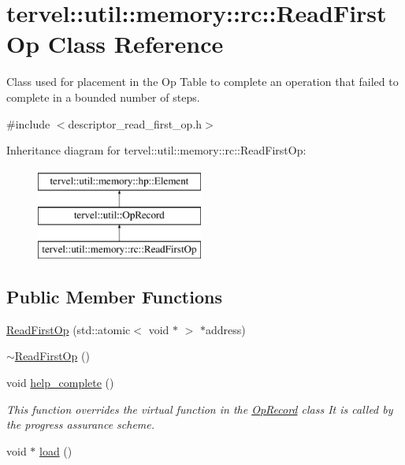 \hypertarget{classtervel_1_1util_1_1memory_1_1rc_1_1_read_first_op}{}\section{tervel\+:\+:util\+:\+:memory\+:\+:rc\+:\+:Read\+First\+Op Class Reference}
\label{classtervel_1_1util_1_1memory_1_1rc_1_1_read_first_op}


Class used for placement in the Op Table to complete an operation that failed to complete in a bounded number of steps.  




{\ttfamily \#include $<$descriptor\+\_\+read\+\_\+first\+\_\+op.\+h$>$}

Inheritance diagram for tervel\+:\+:util\+:\+:memory\+:\+:rc\+:\+:Read\+First\+Op\+:\begin{figure}[H]
\begin{center}
\leavevmode
\includegraphics[height=3.000000cm]{classtervel_1_1util_1_1memory_1_1rc_1_1_read_first_op}
\end{center}
\end{figure}
\subsection*{Public Member Functions}
\begin{DoxyCompactItemize}
\item 
\hyperlink{classtervel_1_1util_1_1memory_1_1rc_1_1_read_first_op_af7cc3260ed88464d0582506c90213ca3}{Read\+First\+Op} (std\+::atomic$<$ void $\ast$ $>$ $\ast$address)
\item 
\hyperlink{classtervel_1_1util_1_1memory_1_1rc_1_1_read_first_op_a7d2703263cf845895cf8523343a44f5a}{$\sim$\+Read\+First\+Op} ()
\item 
void \hyperlink{classtervel_1_1util_1_1memory_1_1rc_1_1_read_first_op_a21e1fa517b7e7f522be78dcc95d810da}{help\+\_\+complete} ()
\begin{DoxyCompactList}\small\item\em This function overrides the virtual function in the \hyperlink{classtervel_1_1util_1_1_op_record}{Op\+Record} class It is called by the progress assurance scheme. \end{DoxyCompactList}\item 
void $\ast$ \hyperlink{classtervel_1_1util_1_1memory_1_1rc_1_1_read_first_op_a814d1034d66ae650e9a9bc0ab1f37521}{load} ()
\end{DoxyCompactItemize}
